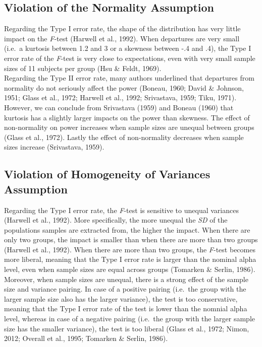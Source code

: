 \documentclass[man,floatsintext]{apa6}
\begin{document}
\hypertarget{violation-of-the-normality-assumption}{%
\subsection{Violation of the Normality Assumption}\label{violation-of-the-normality-assumption}}

Regarding the Type I error rate, the shape of the distribution has very little impact on the \emph{F}-test (Harwell et al., 1992). When departures are very small (i.e.~a kurtosis between 1.2 and 3 or a skewness between -.4 and .4), the Type I error rate of the \emph{F}-test is very close to expectations, even with very small sample sizes of 11 subjects per group (Hsu \& Feldt, 1969).\\
Regarding the Type II error rate, many authors underlined that departures from normality do not seriously affect the power (Boneau, 1960; David \& Johnson, 1951; Glass et al., 1972; Harwell et al., 1992; Srivastava, 1959; Tiku, 1971). However, we can conclude from Srivastava (1959) and Boneau (1960) that kurtosis has a slightly larger impacts on the power than skewness. The effect of non-normality on power increases when sample sizes are unequal between groups (Glass et al., 1972). Lastly the effect of non-normality decreases when sample sizes increase (Srivastava, 1959).

\hypertarget{violation-of-homogeneity-of-variances-assumption}{%
\subsection{Violation of Homogeneity of Variances Assumption}\label{violation-of-homogeneity-of-variances-assumption}}

Regarding the Type I error rate, the \emph{F}-test is sensitive to unequal variances (Harwell et al., 1992). More specifically, the more unequal the \emph{SD} of the populations samples are extracted from, the higher the impact. When there are only two groups, the impact is smaller than when there are more than two groups (Harwell et al., 1992). When there are more than two groups, the \emph{F}-test becomes more liberal, meaning that the Type I error rate is larger than the nominal alpha level, even when sample sizes are equal across groups (Tomarken \& Serlin, 1986). Moreover, when sample sizes are unequal, there is a strong effect of the sample size and variance pairing. In case of a positive pairing (i.e.~the group with the larger sample size also has the larger variance), the test is too conservative, meaning that the Type I error rate of the test is lower than the nomnial alpha level, whereas in case of a negative pairing (i.e.~the group with the larger sample size has the smaller variance), the test is too liberal (Glass et al., 1972; Nimon, 2012; Overall et al., 1995; Tomarken \& Serlin, 1986).
\end{document}
